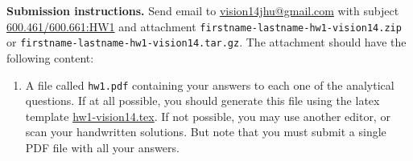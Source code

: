 \documentclass[10pt]{article}
\newcommand{\matlab}[1]{\texttt{#1}}
\begin{document}
\noindent\textbf{Submission instructions.} Send email to \href{mailto:vision14jhu@gmail.com?subject=600.692:HW1}{vision14jhu@gmail.com} with subject  \href{mailto:vision14jhu@gmail.com?subject=600.461/600.661:HW1}{600.461/600.661:HW1} and attachment \matlab{firstname-lastname-hw1-vision14.zip} or \matlab{firstname-lastname-hw1-vision14.tar.gz}. The attachment should have the following content:
%
\begin{enumerate}
\item A file called \matlab{hw1.pdf} containing your answers to each one of the analytical questions. If at all possible,
you should generate this file using the latex template
\href{http://www.vision.jhu.edu/teaching/vision/vision14/Homeworks/hw1-learning14.tex}{hw1-vision14.tex}.
If not possible, you may use another editor, or scan your handwritten solutions.
But note that you must submit a single PDF file with all your answers.

%

\end{enumerate}
\end{document}
